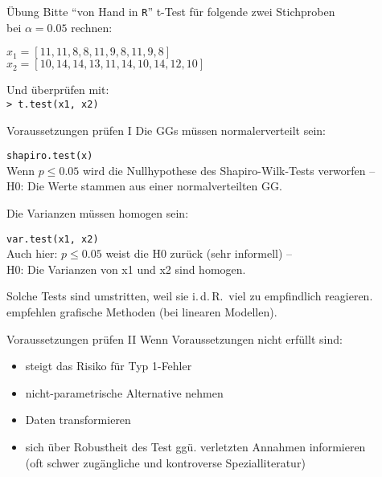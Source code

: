 \begin{frame}
  {Übung}
  Bitte "`von Hand in \texttt{R}"' t-Test für folgende zwei Stichproben\\
  bei $\alpha=0.05$ rechnen:\\
  \begin{center}
    $x_1=[11, 11, 8, 8, 11, 9, 8, 11, 9, 8]$\\
    $x_2=[10, 14, 14, 13, 11, 14, 10, 14, 12, 10]$
  \end{center}
  \pause
  \begin{center}
    Und überprüfen mit:\\
    \texttt{> t.test(x1, x2)}
  \end{center}
\end{frame}

\begin{frame}
  {Voraussetzungen prüfen I}
  Die \alert{GGs müssen normalerverteilt} sein:
  \begin{center}
    \texttt{shapiro.test(x)}\\
    Wenn $p\leq0.05$ wird die Nullhypothese des Shapiro-Wilk-Tests verworfen --\\
    H0: Die Werte stammen aus einer normalverteilten GG.
  \end{center}
  \pause
  Die \alert{Varianzen müssen homogen sein}:
  \begin{center}
    \texttt{var.test(x1, x2)}\\
    Auch hier: $p\leq0.05$ weist die H0 zurück (sehr informell) --\\
    H0: Die Varianzen von x1 und x2 sind homogen.
  \end{center}
\pause
\begin{center}
  \alert{Solche Tests sind umstritten, weil sie i.\,d.\,R.\ viel zu empfindlich reagieren.\\
    \citet{ZuurEa2009} empfehlen \zB grafische Methoden (bei linearen Modellen).}
\end{center}

\end{frame}


\begin{frame}
  {Voraussetzungen prüfen II}
  Wenn Voraussetzungen nicht erfüllt sind:
  \begin{itemize}[<+->]
    \item steigt das Risiko für Typ 1-Fehler
    \item nicht-parametrische Alternative nehmen
    \item Daten transformieren
    \item sich über Robustheit des Test ggü. verletzten Annahmen informieren\\
      (oft schwer zugängliche und kontroverse Spezialliteratur)
  \end{itemize}
\end{frame}

